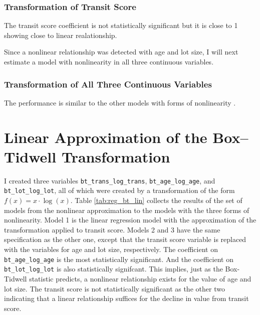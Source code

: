 \subsubsection{Transformation of Transit Score}




The transit score coefficient is not statistically significant but it is close to 1 showing close to linear realationship.

Since a nonlinear relationship was detected with age and lot size,
I will next estimate a model
with nonlinearity in all three continuous variables.


\subsubsection{Transformation of All Three Continuous Variables}





The performance is similar to the other models with
forms of nonlinearity .



\pagebreak
\section{Linear Approximation of the Box--Tidwell Transformation}

I created three variables 
\texttt{bt\_trans\_log\_trans}, \texttt{bt\_age\_log\_age}, and \texttt{bt\_lot\_log\_lot}, 
all of which were created by a transformation of the form $f(x) = x\cdot\log(x)$. 
Table \ref{tab:reg_bt_lin} collects the results
of the set of models from the nonlinear approximation to the models with the three forms of nonlinearity.
Model 1 is the linear regression model with  
the approximation of the transformation applied to transit score. 
Models 2 and 3
have the same specification as the other one, 
except that the transit score variable is replaced with
the variables for age and lot size, respectively. 
The coefficient on \texttt{bt\_age\_log\_age}
is the most statistically significant. 
And the coefficient on \texttt{bt\_lot\_log\_lot} is also statistically signifcant. 
This implies, just as the Box-Tidwell statistic predicts, 
a nonlinear relationship exists for the value of age and lot size.
The transit score is not statistically significant as the other two
indicating that a linear relationship suffices for the decline in value from transit score.




